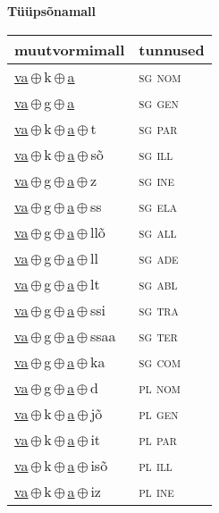 

\vspace{3.5em}
\noindent \begin{minipage}{\textwidth}
\noindent \textbf{Tüüpsõnamall \,}\\

\begin{sideways}
\begin{tabular}{l l}
muutvormimall & tunnused \\
\hline
\underline{va}\,$\oplus$\,k\,$\oplus$\,\underline{a} & \textsc{ sg nom } \\
\underline{va}\,$\oplus$\,g\,$\oplus$\,\underline{a} & \textsc{ sg gen } \\
\underline{va}\,$\oplus$\,k\,$\oplus$\,\underline{a}\,$\oplus$\,t & \textsc{ sg par } \\
\underline{va}\,$\oplus$\,k\,$\oplus$\,\underline{a}\,$\oplus$\,sõ & \textsc{ sg ill } \\
\underline{va}\,$\oplus$\,g\,$\oplus$\,\underline{a}\,$\oplus$\,z & \textsc{ sg ine } \\
\underline{va}\,$\oplus$\,g\,$\oplus$\,\underline{a}\,$\oplus$\,ss & \textsc{ sg ela } \\
\underline{va}\,$\oplus$\,g\,$\oplus$\,\underline{a}\,$\oplus$\,llõ & \textsc{ sg all } \\
\underline{va}\,$\oplus$\,g\,$\oplus$\,\underline{a}\,$\oplus$\,ll & \textsc{ sg ade } \\
\underline{va}\,$\oplus$\,g\,$\oplus$\,\underline{a}\,$\oplus$\,lt & \textsc{ sg abl } \\
\underline{va}\,$\oplus$\,g\,$\oplus$\,\underline{a}\,$\oplus$\,ssi & \textsc{ sg tra } \\
\underline{va}\,$\oplus$\,g\,$\oplus$\,\underline{a}\,$\oplus$\,ssaa & \textsc{ sg ter } \\
\underline{va}\,$\oplus$\,g\,$\oplus$\,\underline{a}\,$\oplus$\,ka & \textsc{ sg com } \\
\underline{va}\,$\oplus$\,g\,$\oplus$\,\underline{a}\,$\oplus$\,d & \textsc{ pl nom } \\
\underline{va}\,$\oplus$\,k\,$\oplus$\,\underline{a}\,$\oplus$\,jõ & \textsc{ pl gen } \\
\underline{va}\,$\oplus$\,k\,$\oplus$\,\underline{a}\,$\oplus$\,it & \textsc{ pl par } \\
\underline{va}\,$\oplus$\,k\,$\oplus$\,\underline{a}\,$\oplus$\,isõ & \textsc{ pl ill } \\
\underline{va}\,$\oplus$\,k\,$\oplus$\,\underline{a}\,$\oplus$\,iz & \textsc{ pl ine } \\

\end{tabular}
\end{sideways}
\end{minipage}
